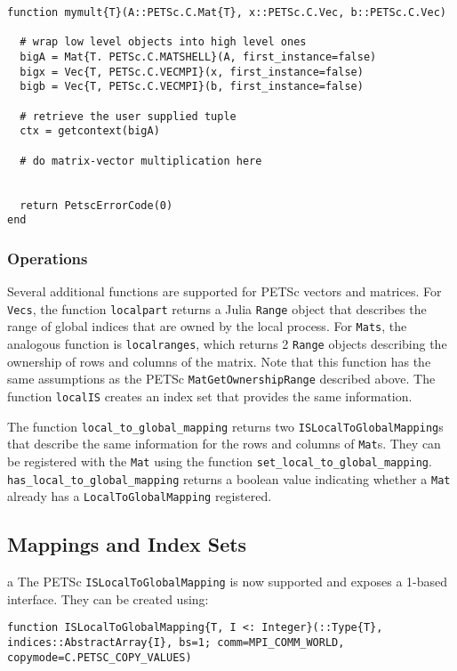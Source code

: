 \documentclass{article}
\begin{document}
\begin{verbatim}
function mymult{T}(A::PETSc.C.Mat{T}, x::PETSc.C.Vec, b::PETSc.C.Vec)

  # wrap low level objects into high level ones
  bigA = Mat{T. PETSc.C.MATSHELL}(A, first_instance=false)
  bigx = Vec{T, PETSc.C.VECMPI}(x, first_instance=false)
  bigb = Vec{T, PETSc.C.VECMPI}(b, first_instance=false)

  # retrieve the user supplied tuple
  ctx = getcontext(bigA)

  # do matrix-vector multiplication here
  

  return PetscErrorCode(0)
end
\end{verbatim}


\subsubsection{Operations}
Several additional functions are supported for PETSc vectors and matrices.
For \texttt{Vecs}, the function \texttt{localpart} returns a Julia \texttt{Range} object that describes the range of global indices that are owned by the 
local process.
For \texttt{Mats}, the analogous function is \texttt{localranges}, which 
returns 2 \texttt{Range} objects describing the ownership of rows and columns
of the matrix.  Note that this function has the same assumptions as the PETSc
\texttt{MatGetOwnershipRange} described above.
The function \texttt{localIS} creates an index set that provides the same 
information.

The function \texttt{local\_to\_global\_mapping} returns two 
\texttt{ISLocalToGlobalMapping}s that describe the same information for 
the rows and columns of \texttt{Mat}s.  They can be registered with the
\texttt{Mat} using the function \texttt{set\_local\_to\_global\_mapping}.
\texttt{has\_local\_to\_global\_mapping} returns a boolean value indicating
whether a \texttt{Mat} already has a \texttt{LocalToGlobalMapping} registered.

\subsection{Mappings and Index Sets} \label{sec:is}a
The PETSc \texttt{ISLocalToGlobalMapping} is now supported and exposes a 
1-based interface.
They can be created using:

\begin{verbatim}
function ISLocalToGlobalMapping{T, I <: Integer}(::Type{T}, indices::AbstractArray{I}, bs=1; comm=MPI_COMM_WORLD, copymode=C.PETSC_COPY_VALUES)
\end{verbatim}
\end{document}
